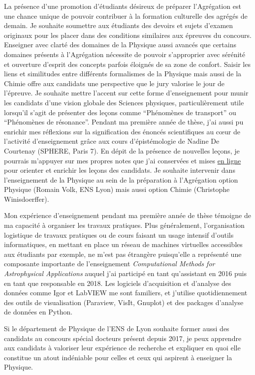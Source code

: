 \documentclass[11pt,onecolumn]{article}
\begin{document}
La présence d’une promotion d’étudiants désireux de préparer l’Agrégation est une chance unique de pouvoir contribuer à la formation culturelle des agrégés de demain. Je souhaite soumettre aux étudiants des devoirs et sujets d’examen originaux pour les placer dans des conditions similaires aux épreuves du concours. Enseigner avec clarté des domaines de la Physique aussi avancés que certains domaines présents à l’Agrégation nécessite de pouvoir s’approprier avec sérénité et ouverture d’esprit des concepts parfois éloignés de sa zone de confort. Saisir les liens et similitudes entre différents formalismes de la Physique mais aussi de la Chimie offre aux candidats une perspective que le jury valorise le jour de l’épreuve. Je souhaite mettre l’accent sur cette forme d’enseignement pour munir les candidats d’une vision globale des Sciences physiques, particulièrement utile lorsqu’il s’agit de présenter des leçons comme “Phénomènes de transport” ou “Phénomènes de résonance”. Pendant ma première année de thèse, j’ai aussi pu enrichir mes réflexions sur la signification des énoncés scientifiques au c\oe{}ur de l’activité d’enseignement grâce aux cours d'épistémologie de Nadine De Courtenay (SPHERE, Paris 7). En dépit de la présence de nouvelles leçons, je pourrais m’appuyer sur mes propres notes que j’ai conservées et mises \href{http://homes.esat.kuleuven.be/~ileyk//resources/LP.pdf}{en ligne} pour orienter et enrichir les leçons des candidats. Je souhaite intervenir dans l’enseignement de la Physique au sein de la préparation à l’Agrégation option Physique (Romain Volk, ENS Lyon) mais aussi option Chimie (Christophe Winisdoerffer).

Mon expérience d’enseignement pendant ma première année de thèse témoigne de ma capacité à organiser les travaux pratiques. Plus généralement, l’organisation logistique de travaux pratiques ou de cours faisant un usage intensif d’outils informatiques, en mettant en place un réseau de machines virtuelles accessibles aux étudiants par exemple, ne m'est pas étrangère puisqu'elle a représenté une composante importante de l'enseignement \textit{Computational Methods for Astrophysical Applications} auquel j'ai participé en tant qu'assistant en 2016 puis en tant que responsable en 2018. Les logiciels d’acquisition et d’analyse des données comme Igor et LabVIEW me sont familiers, et j’utilise quotidiennement des outils de visualisation (Paraview, VisIt, Gnuplot) et des packages d’analyse de données en Python.

Si le département de Physique de l’ENS de Lyon souhaite former aussi des candidats au concours spécial docteurs présent depuis 2017, je peux apprendre aux candidats à valoriser leur expérience de recherche et expliquer en quoi elle constitue un atout indéniable pour celles et ceux qui aspirent à enseigner la Physique.
\end{document}
